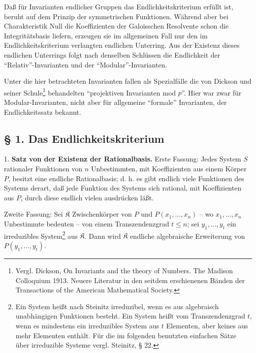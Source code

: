 Daß für Invarianten endlicher Gruppen das Endlichkeitskriterium erfüllt ist, beruht auf dem Prinzip der symmetrischen Funktionen. Während aber bei Charakteristik Null die Koeffizienten der Galoisschen Resolvente schon die Integritätsbasis liefern, erzeugen sie im allgemeinen Fall nur den im Endlichkeitskriterium verlangten endlichen Unterring. Aus der Existenz dieses endlichen Unterrings folgt nach denselben Schlüssen die Endlichkeit der ``Relativ''-Invarianten und der ``Modular''-Invarianten.

Unter die hier betrachteten Invarianten fallen als Spezialfälle die von Dickson und seiner Schule\footnote{Vergl. Dickson, On Invariants and the theory of Numbers. The Madison Colloquium 1913. Neuere Literatur in den seitdem erschienenen Bänden der Transactions of the American Mathematical Society.} behandelten ``projektiven Invarianten mod $p$''. Hier war zwar für Modular-Invarianten, nicht aber für allgemeine ``formale'' Invarianten, der Endlichkeitssatz bekannt.

\subsection*{§ 1. Das Endlichkeitskriterium}

1. \textbf{Satz von der Existenz der Rationalbasis.} Erste Fassung: Jedes System $S$ rationaler Funktionen von $n$ Unbestimmten, mit Koeffizienten aus einem Körper $P$, besitzt eine endliche Rationalbasis; d. h. es gibt endlich viele Funktionen des Systems derart, daß jede Funktion des Systems sich rational, mit Koeffizienten aus $P$, durch diese endlich vielen ausdrücken läßt.

Zweite Fassung: Sei $\mathfrak K$ Zwischenkörper von $P$ und $P(x_1,\ldots,x_n)$ -- wo $x_1,\ldots,x_n$ Unbestimmte bedeuten -- von einem Transzendenzgrad $t\leq n$; sei $y_1,\ldots,y_t$ ein irreduzibles System\footnote{Ein System heißt nach Steinitz irreduzibel, wenn es aus algebraisch unabhängigen Funktionen besteht. Ein System heißt vom Transzendenzgrad $t$, wenn es mindestens ein irreduzibles System aus $t$ Elementen, aber keines aus mehr Elementen enthält. Für die im folgenden benutzten einfachen Sätze über irreduzible Systeme vergl. Steinitz, § 22.} aus $\mathfrak K$. Dann wird $\mathfrak K$ endliche algebraische Erweiterung von $P(y_1,\ldots,y_t)$.

